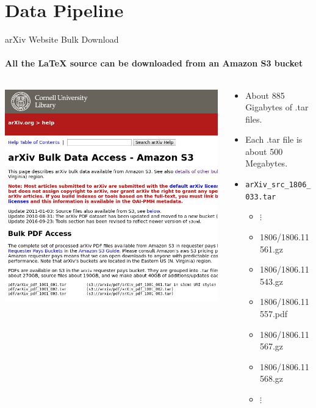 \documentclass[10pt]{beamer}
\begin{document}
\section{Data Pipeline}
\begin{frame}{arXiv Website Bulk Download}
    \framesubtitle{All the \LaTeX{} source can be downloaded from an Amazon S3 bucket}
    \begin{columns}[T]
        \begin{column}{0.4\textwidth}
    \includegraphics[width=\textwidth]{bulk_download.png} 
        \end{column}
        \begin{column}{0.6\textwidth}
            \begin{itemize}
                \item About 885 Gigabytes of .tar files.
                \item Each .tar file is about 500 Megabytes.
                \item \texttt{arXiv\_src\_1806\_033.tar}
                    \begin{itemize}
\item \hspace{4em}      $\vdots$
\item 1806/1806.11561.gz
\item 1806/1806.11543.gz
\item 1806/1806.11557.pdf
\item 1806/1806.11567.gz
\item 1806/1806.11568.gz
\item \hspace{4em}      $\vdots$
\end{itemize}


            \end{itemize}
        \end{column}
    \end{columns}
\end{frame}
\end{document}
